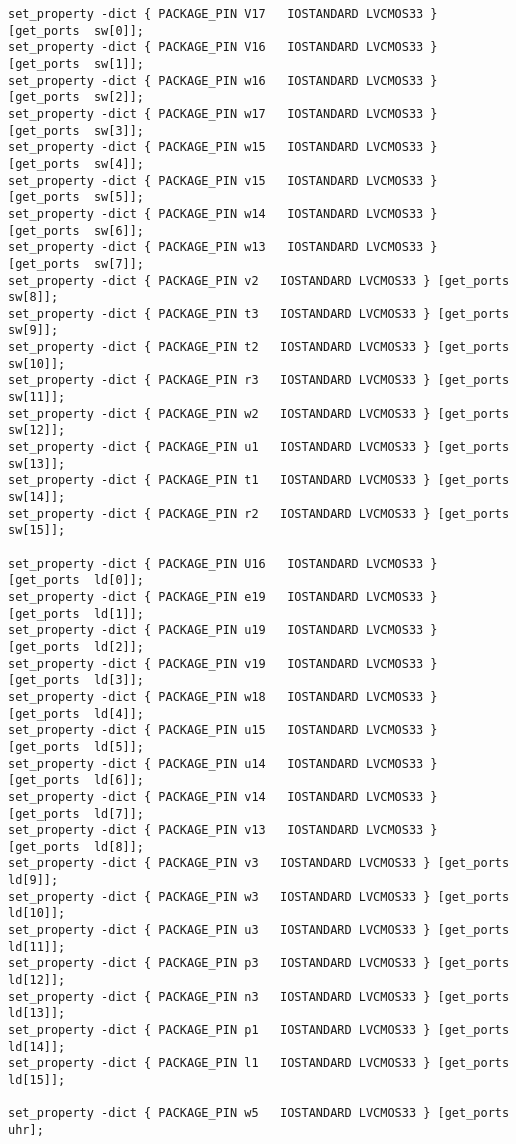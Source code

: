 \documentclass{article}
\begin{document}
\begin{verbatim}
set_property -dict { PACKAGE_PIN V17   IOSTANDARD LVCMOS33 } [get_ports  sw[0]];
set_property -dict { PACKAGE_PIN V16   IOSTANDARD LVCMOS33 } [get_ports  sw[1]];
set_property -dict { PACKAGE_PIN w16   IOSTANDARD LVCMOS33 } [get_ports  sw[2]];
set_property -dict { PACKAGE_PIN w17   IOSTANDARD LVCMOS33 } [get_ports  sw[3]];
set_property -dict { PACKAGE_PIN w15   IOSTANDARD LVCMOS33 } [get_ports  sw[4]];
set_property -dict { PACKAGE_PIN v15   IOSTANDARD LVCMOS33 } [get_ports  sw[5]];
set_property -dict { PACKAGE_PIN w14   IOSTANDARD LVCMOS33 } [get_ports  sw[6]];
set_property -dict { PACKAGE_PIN w13   IOSTANDARD LVCMOS33 } [get_ports  sw[7]];
set_property -dict { PACKAGE_PIN v2   IOSTANDARD LVCMOS33 } [get_ports  sw[8]];
set_property -dict { PACKAGE_PIN t3   IOSTANDARD LVCMOS33 } [get_ports  sw[9]];
set_property -dict { PACKAGE_PIN t2   IOSTANDARD LVCMOS33 } [get_ports  sw[10]];
set_property -dict { PACKAGE_PIN r3   IOSTANDARD LVCMOS33 } [get_ports  sw[11]];
set_property -dict { PACKAGE_PIN w2   IOSTANDARD LVCMOS33 } [get_ports  sw[12]];
set_property -dict { PACKAGE_PIN u1   IOSTANDARD LVCMOS33 } [get_ports  sw[13]];
set_property -dict { PACKAGE_PIN t1   IOSTANDARD LVCMOS33 } [get_ports  sw[14]];
set_property -dict { PACKAGE_PIN r2   IOSTANDARD LVCMOS33 } [get_ports  sw[15]];

set_property -dict { PACKAGE_PIN U16   IOSTANDARD LVCMOS33 } [get_ports  ld[0]];
set_property -dict { PACKAGE_PIN e19   IOSTANDARD LVCMOS33 } [get_ports  ld[1]];
set_property -dict { PACKAGE_PIN u19   IOSTANDARD LVCMOS33 } [get_ports  ld[2]];
set_property -dict { PACKAGE_PIN v19   IOSTANDARD LVCMOS33 } [get_ports  ld[3]];
set_property -dict { PACKAGE_PIN w18   IOSTANDARD LVCMOS33 } [get_ports  ld[4]];
set_property -dict { PACKAGE_PIN u15   IOSTANDARD LVCMOS33 } [get_ports  ld[5]];
set_property -dict { PACKAGE_PIN u14   IOSTANDARD LVCMOS33 } [get_ports  ld[6]];
set_property -dict { PACKAGE_PIN v14   IOSTANDARD LVCMOS33 } [get_ports  ld[7]];
set_property -dict { PACKAGE_PIN v13   IOSTANDARD LVCMOS33 } [get_ports  ld[8]];
set_property -dict { PACKAGE_PIN v3   IOSTANDARD LVCMOS33 } [get_ports  ld[9]];
set_property -dict { PACKAGE_PIN w3   IOSTANDARD LVCMOS33 } [get_ports  ld[10]];
set_property -dict { PACKAGE_PIN u3   IOSTANDARD LVCMOS33 } [get_ports  ld[11]];
set_property -dict { PACKAGE_PIN p3   IOSTANDARD LVCMOS33 } [get_ports  ld[12]];
set_property -dict { PACKAGE_PIN n3   IOSTANDARD LVCMOS33 } [get_ports  ld[13]];
set_property -dict { PACKAGE_PIN p1   IOSTANDARD LVCMOS33 } [get_ports  ld[14]];
set_property -dict { PACKAGE_PIN l1   IOSTANDARD LVCMOS33 } [get_ports  ld[15]];

set_property -dict { PACKAGE_PIN w5   IOSTANDARD LVCMOS33 } [get_ports  uhr];
\end{verbatim}
\end{document}

